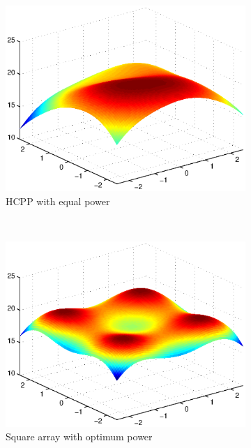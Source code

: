 \documentclass{beamer}
\theoremstyle{remark}
\begin{document}
\begin{frame}
\begin{figure}[!]
\begin{subfigure}{0.3\columnwidth}
\includegraphics[width=\columnwidth]{c4_hcpp_SNR_Eq}
\caption{HCPP with equal power}
\end{subfigure}
\\
\begin{subfigure}{0.3\columnwidth}
\includegraphics[width=\columnwidth]{c4_sqArr_SNR_opt}
\caption{Square array with optimum power}
\end{subfigure}~
\begin{subfigure}{0.3\columnwidth}

\end{subfigure}
\end{figure}
\end{frame}
\end{document}
